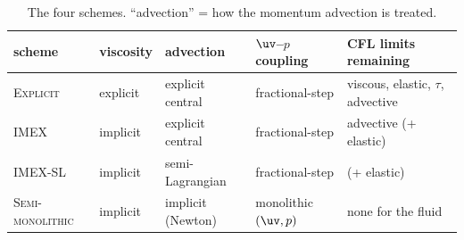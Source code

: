 \begin{table}[t]\centering\small
\caption{The four schemes. ``advection'' = how the momentum advection is treated.}
\label{tab:schemes}
\begin{tabular}{@{}lllll@{}}
\toprule
scheme & viscosity & advection & $\uv$--$p$ coupling & CFL limits remaining \\
\midrule
\textsc{Explicit} & explicit & explicit central & fractional-step & viscous, elastic, $\tau$, advective \\
\textsc{IMEX} & implicit & explicit central & fractional-step & advective (+ elastic) \\
\textsc{IMEX-SL} & implicit & semi-Lagrangian & fractional-step & (+ elastic) \\
\textsc{Semi-monolithic} & implicit & implicit (Newton) & monolithic $(\uv,p)$ & none for the fluid \\
\bottomrule
\end{tabular}
\end{table}
